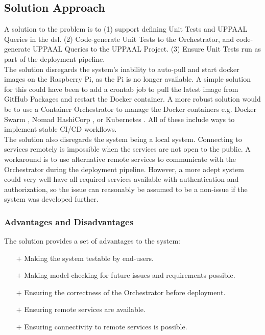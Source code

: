 \subsection{Solution Approach}

A solution to the problem is to (1) support defining Unit Tests and UPPAAL Queries in the \acrshort{dsl}. (2) Code-generate Unit Tests to the Orchestrator, and code-generate UPPAAL Queries to the UPPAAL Project. (3) Ensure Unit Tests run as part of the deployment pipeline.\\

The solution disregards the system's inability to auto-pull and start docker images on the Raspberry Pi, as the Pi is no longer available. A simple solution for this could have been to add a crontab job \cite{crontab} to pull the latest image from GitHub Packages and restart the Docker container. A more robust solution would be to use a Container Orchestrator to manage the Docker containers e.g. Docker Swarm \cite{docker-swarm}, Nomad HashiCorp \cite{hashicorp-nomad}, or Kubernetes \cite{kubernetes}. All of these include ways to implement stable CI/CD workflows.\\

The solution also disregards the system being a local system. Connecting to services remotely is impossible when the services are not open to the public. A workaround is to use alternative remote services to communicate with the Orchestrator during the deployment pipeline. However, a more adept system could very well have all required services available with authentication and authorization, so the issue can reasonably be assumed to be a non-issue if the system was developed further.\\

\newpage
\subsubsection{Advantages and Disadvantages}
The solution provides a set of advantages to the system:

\begin{itemize}
    \item [$+$] Making the system testable by end-users.
    \item [$+$] Making model-checking for future issues and requirements possible.
    \item [$+$] Ensuring the correctness of the Orchestrator before deployment.
    \item [$+$] Ensuring remote services are available.
    \item [$+$] Ensuring connectivity to remote services is possible.
\end{itemize}

